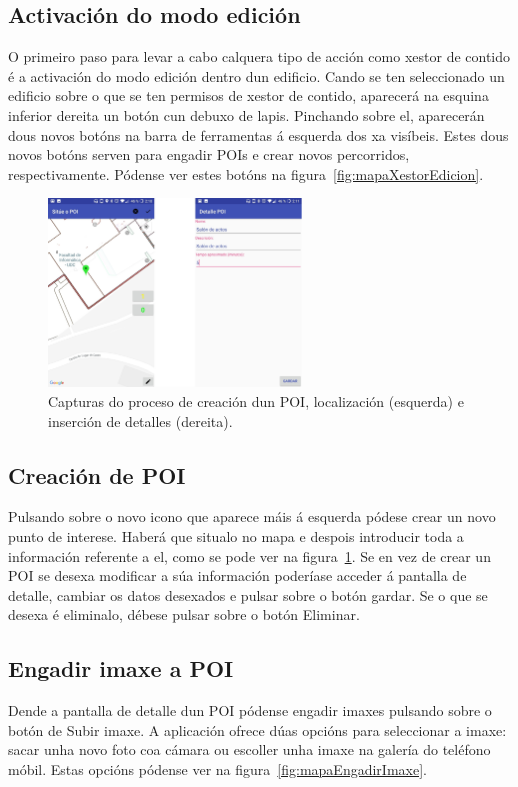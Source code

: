 \subsection{Activación do modo edición}
O primeiro paso para levar a cabo calquera tipo de acción como xestor de contido é a activación do modo edición dentro dun edificio. Cando se ten seleccionado un edificio sobre o que se ten permisos de xestor de contido, aparecerá na esquina inferior dereita un botón cun debuxo de lapis. Pinchando sobre el, aparecerán dous novos botóns na barra de ferramentas á esquerda dos xa visíbeis. Estes dous novos botóns serven para engadir POIs e crear novos percorridos, respectivamente. Pódense ver estes botóns na figura~\ref{fig:mapaXestorEdicion}.

\begin{figure}[h]
	\begin{center}
		\includegraphics[width=0.6\textwidth]{figures/android/mapaCrearPoi}
		\caption{Capturas do proceso de creación dun POI, localización (esquerda) e inserción de detalles (dereita).}
		\label{fig:mapaCrearPoi}
	\end{center}
\end{figure}

\subsection{Creación de POI}
Pulsando sobre o novo icono que aparece máis á esquerda pódese crear un novo punto de interese. Haberá que situalo no mapa e despois introducir toda a información referente a el, como se pode ver na figura~\ref{fig:mapaCrearPoi}. Se en vez de crear un POI se desexa modificar a súa información poderíase acceder á pantalla de detalle, cambiar os datos desexados e pulsar sobre o botón gardar. Se o que se desexa é eliminalo, débese pulsar sobre o botón Eliminar.

\subsection{Engadir imaxe a POI}
Dende a pantalla de detalle dun POI pódense engadir imaxes pulsando sobre o botón de Subir imaxe. A aplicación ofrece dúas opcións para seleccionar a imaxe: sacar unha novo foto coa cámara ou escoller unha imaxe na galería do teléfono móbil. Estas opcións pódense ver na figura~\ref{fig:mapaEngadirImaxe}.

